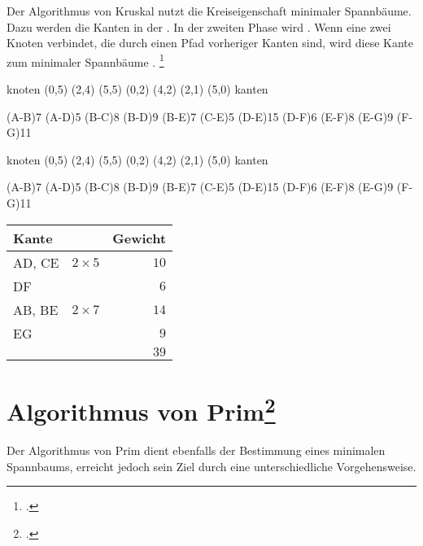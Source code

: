 \documentclass{lehramt-informatik}
\begin{document}
Der Algorithmus von Kruskal nutzt die Kreiseigenschaft minimaler
Spannbäume. Dazu werden die Kanten in der 
. In der zweiten Phase
wird . Wenn eine
 zwei Knoten verbindet, die  durch einen
Pfad vorheriger Kanten  sind, wird diese Kante zum
minimaler Spannbäume .
\footcite{wiki:kruskal}

\def\TmpGraph#1{
  \graph knoten {
    \knoten{A}(0,5)
    \knoten{B}(2,4)
    \knoten{C}(5,5)
    \knoten{D}(0,2)
    \knoten{E}(4,2)
    (2,1)
    (5,0)
  } kanten {
    #1
  }
}

\TmpGraph{
  \kante(A-B){7}
  \kante(A-D){5}
  \kante(B-C){8}
  \kante(B-D){9}
  \kante(B-E){7}
  \kante(C-E){5}
  \kante(D-E){15}
  \kante(D-F){6}
  \kante(E-F){8}
  \kante(E-G){9}
  \kante(F-G){11}
}

\begin{minipage}{7cm}
\TmpGraph{
  \KANTE(A-B){7}
  \KANTE(A-D){5}
  \kante(B-C){8}
  \kante(B-D){9}
  \KANTE(B-E){7}
  \KANTE(C-E){5}
  \kante(D-E){15}
  \KANTE(D-F){6}
  \kante(E-F){8}
  \KANTE(E-G){9}
  \kante(F-G){11}
}
\end{minipage}
\begin{minipage}{4cm}
\begin{center}
\begin{tabular}{|l|l|r|}
\hline
Kante & & Gewicht\\\hline\hline
AD, CE & $2 \times 5$ & $10$\\
DF     &              & $6$\\
AB, BE & $2 \times 7$ & $14$\\
EG     &              & $9$\\\hline
       &              & $39$\\\hline
\end{tabular}
\end{center}
\end{minipage}

%

\section{Algorithmus von Prim\footcite{wiki:prim}}

Der Algorithmus von Prim dient ebenfalls der Bestimmung eines minimalen
Spannbaums, erreicht jedoch sein Ziel durch eine unterschiedliche
Vorgehensweise.
\end{document}
